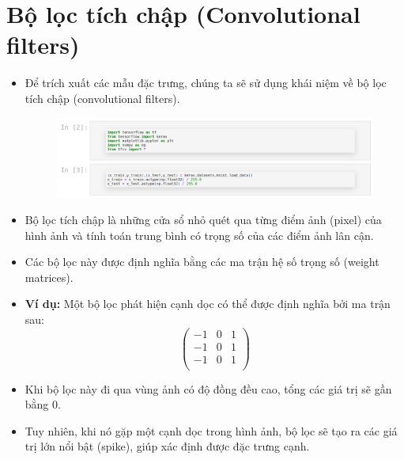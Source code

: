 \documentclass{book}
\begin{document}
\section{Bộ lọc tích chập (Convolutional filters)}
\begin{itemize}
    \item Để trích xuất các mẫu đặc trưng, chúng ta sẽ sử dụng khái niệm về bộ lọc tích chập (convolutional filters).
    \begin{figure}[H]
        \centering
        \includegraphics[width=1.0\linewidth]{images/code1.png}
        \label{fig:code1}
    \end{figure}
    \item Bộ lọc tích chập là những cửa sổ nhỏ quét qua từng điểm ảnh (pixel) của hình ảnh và tính toán trung bình có trọng số của các điểm ảnh lân cận.

    \item Các bộ lọc này được định nghĩa bằng các ma trận hệ số trọng số (weight matrices).

    \item \textbf{Ví dụ:} Một bộ lọc phát hiện cạnh dọc có thể được định nghĩa bởi ma trận sau:
    \[
    \begin{pmatrix}
        -1 & 0 & 1 \\
        -1 & 0 & 1 \\
        -1 & 0 & 1 \\
    \end{pmatrix}
    \]
    \item Khi bộ lọc này đi qua vùng ảnh có độ đồng đều cao, tổng các giá trị sẽ gần bằng 0.
    \item Tuy nhiên, khi nó gặp một cạnh dọc trong hình ảnh, bộ lọc sẽ tạo ra các giá trị lớn nổi bật (spike), giúp xác định được đặc trưng cạnh.
\end{itemize}
\end{document}
